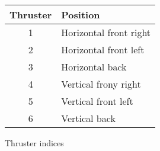\begin{figure}
	\begin{center}
		\begin{tabular}{c l}
			Thruster & Position \\
			\hline		
			1 & Horizontal front right \\
			2 & Horizontal front left \\
			3 & Horizontal back \\
			4 & Vertical frony right \\
			5 & Vertical front left \\
			6 & Vertical back
		\end{tabular}
	\caption{Thruster indices}
	\label{fig:THRUSTERINDICES}
	 \end{center}
 \end{figure}
		 